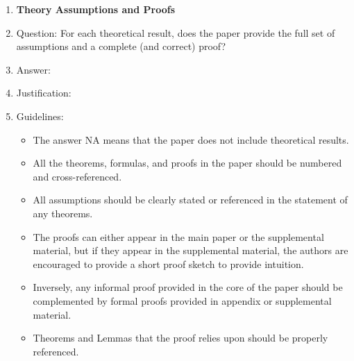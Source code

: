 \documentclass{article}
\begin{document}
\begin{enumerate}
\item {\bf Theory Assumptions and Proofs}
    \item[] Question: For each theoretical result, does the paper provide the full set of assumptions and a complete (and correct) proof?
    \item[] Answer: \answerNA{} %
    \item[] Justification:
    \item[] Guidelines:
    \begin{itemize}
        \item The answer NA means that the paper does not include theoretical results. 
        \item All the theorems, formulas, and proofs in the paper should be numbered and cross-referenced.
        \item All assumptions should be clearly stated or referenced in the statement of any theorems.
        \item The proofs can either appear in the main paper or the supplemental material, but if they appear in the supplemental material, the authors are encouraged to provide a short proof sketch to provide intuition. 
        \item Inversely, any informal proof provided in the core of the paper should be complemented by formal proofs provided in appendix or supplemental material.
        \item Theorems and Lemmas that the proof relies upon should be properly referenced. 
    \end{itemize}


\end{enumerate}
\end{document}
